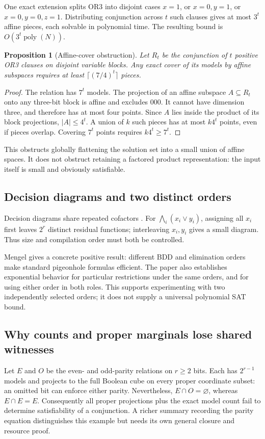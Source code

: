 \documentclass[11pt]{article}
\newtheorem{proposition}[theorem]{Proposition}
\begin{document}
One exact extension splits OR3 into disjoint cases
$x=1$, or $x=0,y=1$, or $x=0,y=0,z=1$.
Distributing conjunction across $t$ such clauses gives at most $3^t$
affine pieces, each solvable in polynomial time.
The resulting bound is $O(3^t\operatorname{poly}(N))$.

\begin{proposition}[Affine-cover obstruction]\label{prop:affine}
Let $R_t$ be the conjunction of $t$ positive OR3 clauses on disjoint
variable blocks. Any exact cover of its models by affine subspaces
requires at least $\lceil(7/4)^t\rceil$ pieces.
\end{proposition}
\begin{proof}
The relation has $7^t$ models. The projection of an affine subspace
$A\subseteq R_t$ onto any three-bit block is affine and excludes $000$.
It cannot have dimension three, and therefore has at most four points.
Since $A$ lies inside the product of its block projections,
$|A|\leq4^t$. A union of $k$ such pieces has at most $k4^t$ points,
even if pieces overlap. Covering $7^t$ points requires $k4^t\geq7^t$.
\end{proof}
This obstructs globally flattening the solution set into a small union
of affine spaces. It does not obstruct retaining a factored product
representation: the input itself is small and obviously satisfiable.

\subsection{Decision diagrams and two distinct orders}
Decision diagrams share repeated cofactors \cite{bryant,darwiche}.
For $\bigwedge_i(x_i\lor y_i)$, assigning all $x_i$ first leaves $2^r$
distinct residual functions; interleaving $x_i,y_i$ gives a small diagram.
Thus size and compilation order must both be controlled.

Mengel \cite{mengel} gives a concrete positive result: different BDD and
elimination orders make standard pigeonhole formulas efficient.
The paper also establishes exponential behavior for particular
restrictions under the same orders, and for using either order in both
roles. This supports experimenting with two independently selected orders;
it does not supply a universal polynomial SAT bound.

\subsection{Why counts and proper marginals lose shared witnesses}
Let $E$ and $O$ be the even- and odd-parity relations on $r\geq2$ bits.
Each has $2^{r-1}$ models and projects to the full Boolean cube on
every proper coordinate subset: an omitted bit can enforce either parity.
Nevertheless, $E\cap O=\varnothing$, whereas $E\cap E=E$.
Consequently all proper projections plus the exact model count fail to
determine satisfiability of a conjunction. A richer summary recording the
parity equation distinguishes this example but needs its own general
closure and resource proof.
\end{document}
